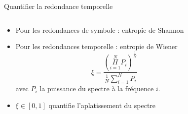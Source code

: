 \documentclass[9pt, aspectratio=169]{beamer}
\begin{document}
\begin{frame}{Quantifier la redondance temporelle} %

\begin{columns}
   \begin{column}{0.6\textwidth}


        \begin{itemize}
            \item Pour les redondances de symbole : entropie de Shannon
            \item Pour les redondances temporelle : entropie de Wiener
            \begin{equation*}
            	\xi = \frac{\left(\Pi\limits_{i=1}^N P_i \right)^\frac{1}{N}}{\frac{1}{N}\sum\limits_{i=1}^N P_i}
            \end{equation*}
            avec $P_i$ la puissance du spectre à la fréquence $i$.
            \item $\xi \in [0, 1]$ quantifie l'aplatissement du spectre
        
        \end{itemize}
        
   \end{column}
   \begin{column}{0.39\textwidth}
		
   \end{column}
\end{columns}
\end{frame}
\end{document}
